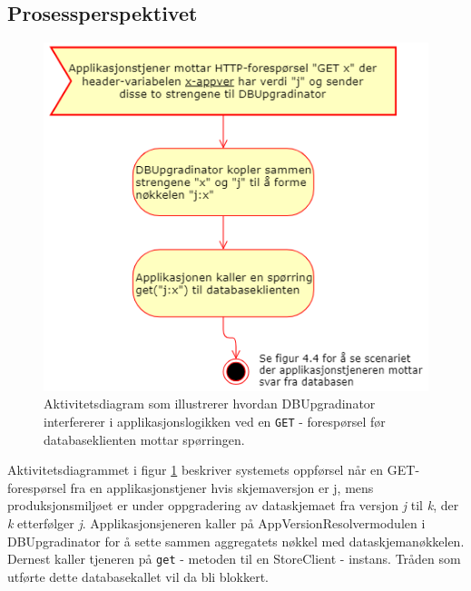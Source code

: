 \subsection{Prosessperspektivet}

\begin{figure}[hbtp]
  \centering
  \includegraphics[scale=0.8]{fig/dbupgradinator-prosess-1.png}
  \caption{Aktivitetsdiagram som illustrerer hvordan DBUpgradinator interfererer i applikasjonslogikken ved en \texttt{GET} - forespørsel før databaseklienten mottar spørringen.}
  \label{fig7}
\end{figure}

Aktivitetsdiagrammet i figur \ref{fig7} beskriver systemets oppførsel når en GET-forespørsel fra en applikasjonstjener hvis skjemaversjon er j, mens produksjonsmiljøet er under oppgradering av dataskjemaet fra versjon \emph{j} til \emph{k}, der \emph{k} etterfølger \emph{j}. Applikasjonsjeneren kaller på AppVersionResolver\-modulen i DBUpgradinator for å sette sammen aggregatets nøkkel med dataskjemanøkkelen. Dernest kaller tjeneren på \texttt{get} - metoden til en StoreClient - instans. Tråden som utførte dette databasekallet vil da bli blokkert.

